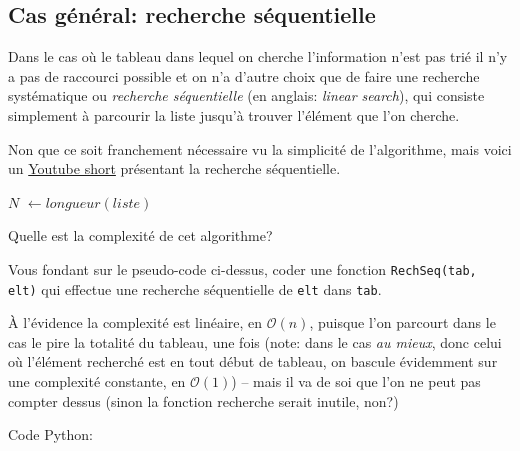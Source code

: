 \documentclass[12pt]{article}
\begin{document}
	\subsection{Cas général: recherche séquentielle}
	Dans le cas où le tableau dans lequel on cherche l'information n'est pas trié il n'y a pas de raccourci possible et on n'a d'autre choix que de faire une recherche systématique ou \textit{recherche séquentielle} (en anglais: \textit{linear search}), qui consiste simplement à parcourir la liste jusqu'à trouver l'élément que l'on cherche.
	
	\begin{MaVid}
		Non que ce soit franchement nécessaire vu la simplicité de l'algorithme, mais voici un \href{https://youtu.be/D7sMvXltMiU}{Youtube short} présentant la recherche séquentielle.
	\end{MaVid}
	
	
	
	\begin{MaReponse}
		\begin{algorithmic}[1]
			\State $N$ $\leftarrow longueur(liste)$
			\State{}
			\EndIf
			\EndFor
			\State{}
			\EndFunction
		\end{algorithmic}
	\end{MaReponse}
		
	\begin{MonExo}
		\begin{alphenum}
			\item Quelle est la complexité de cet algorithme?
			\item Vous fondant sur le pseudo-code ci-dessus, coder une fonction \texttt{RechSeq(tab, elt)} qui effectue une recherche séquentielle de \texttt{elt} dans \texttt{tab}.
		\end{alphenum}
	\end{MonExo}
	\begin{MaReponse}
		\begin{alphenum}
			\item À l'évidence la complexité est linéaire, en $\mathcal{O}(n)$, puisque l'on parcourt dans le cas le pire la totalité du tableau, une fois (note: dans le cas \textit{au mieux}, donc celui où l'élément recherché est en tout début de tableau, on bascule évidemment sur une complexité constante, en $\mathcal{O}(1)$) -- mais il va de soi que l'on ne peut pas compter dessus (sinon la fonction recherche serait inutile, non?)
			\item Code Python:			
			\MonPython{010_RechSeq.py}
		\end{alphenum}
	\end{MaReponse}
	
\end{document}
